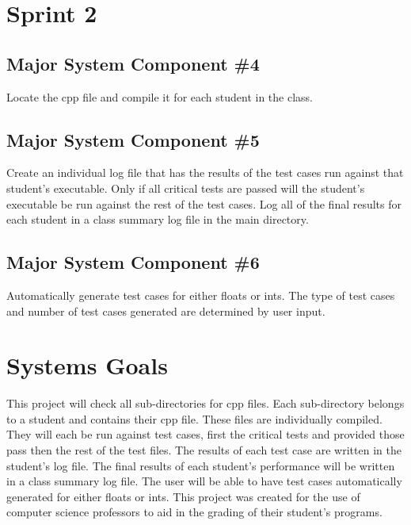 \section{Sprint 2}

\subsection{Major System Component \#4}
Locate the cpp file and compile it for each student in the class.

\subsection{Major System Component \#5}
Create an individual log file that has the results of the test cases run against
that student's executable. Only if all critical tests are passed will the student's
executable be run against the rest of the test cases. Log all of the final results
for each student in a class summary log file in the main directory.

\subsection{Major System Component \#6}
Automatically generate test cases for either floats or ints. The type of test cases
and number of test cases generated are determined by user input.

\section{Systems Goals}
This project will check all sub-directories for cpp files. Each sub-directory
belongs to a student and contains their cpp file. These files are individually
compiled. They will each be run against test cases, first the critical tests and
provided those pass then the rest of the test files. The results of each test case
are written in the student's log file. The final results of each student's
performance will be written in a class summary log file. The user will be able
to have test cases automatically generated for either floats or ints. This project
was created for the use of computer science professors to aid in the grading of
their student's programs.

